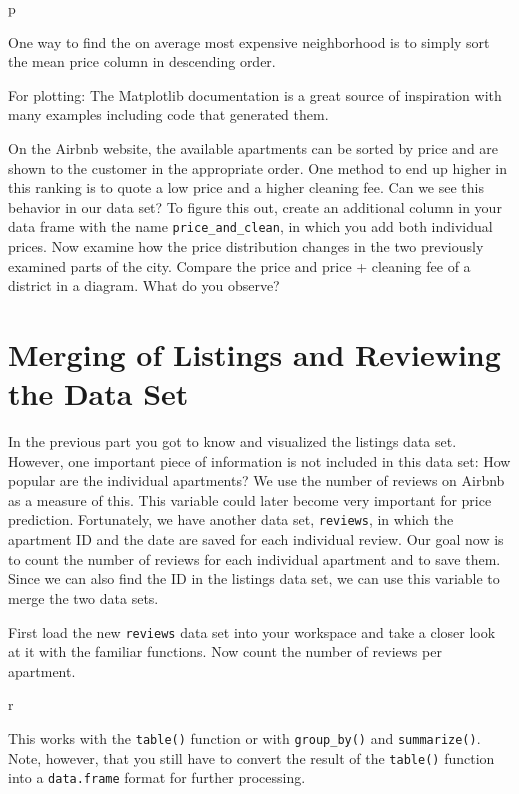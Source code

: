 \documentclass[
  11pt,
]{book}
\begin{document}
\begin{tipsp}p

One way to find the on average most expensive neighborhood is to simply
sort the mean price column in descending order.

For plotting: The Matplotlib documentation is a great source of
inspiration with many examples including code that generated them.

\end{tipsp}

On the Airbnb website, the available apartments can be sorted by price
and are shown to the customer in the appropriate order. One method to
end up higher in this ranking is to quote a low price and a higher
cleaning fee. Can we see this behavior in our data set? To figure this
out, create an additional column in your data frame with the name
\texttt{price\_and\_clean}, in which you add both individual prices. Now
examine how the price distribution changes in the two previously
examined parts of the city. Compare the price and price + cleaning fee
of a district in a diagram. What do you observe?

\hypertarget{merging-of-listings-and-reviewing-the-data-set}{%
\section{Merging of Listings and Reviewing the Data
Set}\label{merging-of-listings-and-reviewing-the-data-set}}

In the previous part you got to know and visualized the listings data
set. However, one important piece of information is not included in this
data set: How popular are the individual apartments? We use the number
of reviews on Airbnb as a measure of this. This variable could later
become very important for price prediction. Fortunately, we have another
data set, \texttt{reviews}, in which the apartment ID and the date are
saved for each individual review. Our goal now is to count the number of
reviews for each individual apartment and to save them. Since we can
also find the ID in the listings data set, we can use this variable to
merge the two data sets.

First load the new \texttt{reviews} data set into your workspace and
take a closer look at it with the familiar functions. Now count the
number of reviews per apartment.

\begin{tips}r

This works with the \texttt{table()} function or with
\texttt{group\_by()} and \texttt{summarize()}. Note, however, that you
still have to convert the result of the \texttt{table()} function into a
\texttt{data.frame} format for further processing.

\end{tips}
\end{document}
